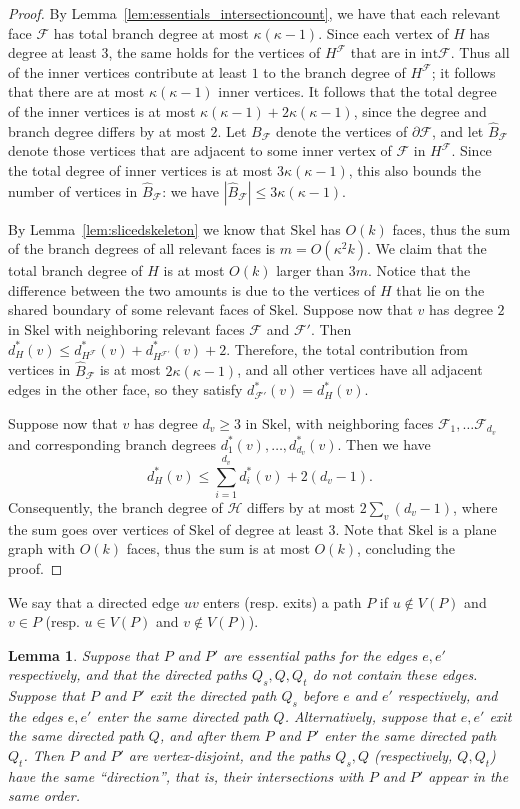 \documentclass[a4paper,11pt]{article}
\newcommand{\bd}{\partial}
\newcommand{\inter}{\mathrm{int}}
\newcommand{\calF}{\mathcal{F}}
\newcommand{\calH}{\mathcal{H}}
\newcommand{\Skel}{\mathrm{Skel}}
\theoremstyle{plain}
\newtheorem{lemma}[theorem]{Lemma}
\newtheorem{identification rule}{Identification Rule}
\theoremstyle{definition}
\theoremstyle{remark}
\begin{document}
\begin{proof}
By Lemma~\ref{lem:essentials_intersectioncount}, we have that each relevant face $\calF$ has total branch degree at most $\kappa(\kappa-1)$. Since each vertex of $H$ has degree at least $3$, the same holds for the vertices of $H^\calF$ that are in $\inter \calF$. Thus all of the inner vertices contribute at least $1$ to the branch degree of $H^\calF$; it follows that there are at most $\kappa(\kappa-1)$ inner vertices. It follows that the total degree of the inner vertices is at most $\kappa(\kappa-1)+2\kappa(\kappa-1)$, since the degree and branch degree differs by at most $2$. Let $B_\calF$ denote the vertices of $\bd\calF$, and let $\hat B_\calF$ denote those vertices that are adjacent to some inner vertex of $\calF$ in $H^\calF$. Since the total degree of inner vertices is at most $3\kappa(\kappa-1)$, this also bounds the number of vertices in $\hat B_\calF$: we have $|\hat B_\calF|\leq 3\kappa(\kappa-1)$.

By Lemma~\ref{lem:slicedskeleton} we know that $\Skel$ has $O(k)$ faces, thus the sum of the branch degrees of all relevant faces is $m=O(\kappa^2k)$. We claim that the total branch degree of $H$ is at most $O(k)$ larger than $3m$. Notice that the difference between the two amounts is due to the vertices of $H$ that lie on the shared boundary of some relevant faces of $\Skel$. Suppose now that $v$ has degree $2$ in $\Skel$ with neighboring relevant faces $\calF$ and $\calF'$. Then $d^*_H(v)\leq d^*_{H^\calF}(v)+d^*_{H^{\calF'}}(v) + 2$. Therefore, the total contribution from vertices in $\hat B_\calF$ is at most $2\kappa(\kappa-1)$, and all other vertices have all adjacent edges in the other face, so they satisfy $d^*_{\calF'}(v)=d^*_H(v)$.

Suppose now that $v$ has degree $d_v\geq 3$ in $\Skel$, with neighboring faces $\calF_1,\dots\calF_{d_v}$ and corresponding branch degrees $d^*_1(v),\dots, d^*_{d_v}(v)$. Then we have
\[ d^*_H(v)\leq \sum_{i=1}^{d_v} d^*_i(v) + 2(d_v -1).\]
Consequently, the branch degree of $\calH$ differs by at most $2\sum_v(d_v -1)$, where the sum goes over vertices of $\Skel$ of degree at least $3$. Note that $\Skel$ is a plane graph with $O(k)$ faces, thus the sum is at most $O(k)$, concluding the proof.
\end{proof}

We say that a directed edge $uv$ enters (resp. exits) a path $P$ if $u \not\in V(P)$ and $v\in P$ (resp. $u\in V(P)$ and $v\not\in V(P)$).

\begin{lemma}\label{lem:disjoint_essential}
Suppose that $P$ and $P'$ are essential paths for the edges $e,e'$ respectively, and that the directed paths $Q_s,Q,Q_t$ do not contain these edges. Suppose that $P$ and $P'$ exit the directed path $Q_s$ before $e$ and $e'$ respectively, and the edges $e,e'$ enter the same directed path $Q$. Alternatively, suppose that $e,e'$ exit the same directed path $Q$, and after them $P$ and $P'$ enter the same directed path $Q_t$. Then $P$ and $P'$ are vertex-disjoint, and the paths $Q_s,Q$ (respectively, $Q,Q_t$) have the same ``direction'', that is, their intersections with $P$ and $P'$ appear in the same order.
\end{lemma}
\end{document}
